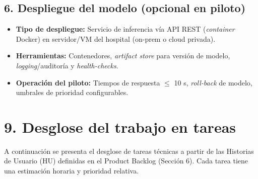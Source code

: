 \documentclass[
11pt, %
]{charter}
\begin{document}
\subsection*{6. Despliegue del modelo (opcional en piloto)}
\begin{itemize}
  \item \textbf{Tipo de despliegue:} Servicio de inferencia vía API REST (\textit{container} Docker) en servidor/VM del hospital (on-prem o cloud privada).
  \item \textbf{Herramientas:} Contenedores, \textit{artifact store} para versión de modelo, \textit{logging}/auditoría y \textit{health-checks}.
  \item \textbf{Operación del piloto:} Tiempos de respuesta \(\leq\) 10 s, \textit{roll-back} de modelo, umbrales de prioridad configurables.
\end{itemize}


\section{9. Desglose del trabajo en tareas}

A continuación se presenta el desglose de tareas técnicas a partir de las Historias de Usuario (HU) definidas en el Product Backlog (Sección 6). 
Cada tarea tiene una estimación horaria y prioridad relativa.
\end{document}
